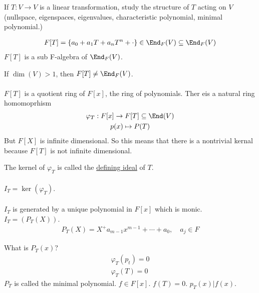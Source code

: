 \documentclass[class=scrartcl, crop=false]{standalone}
\begin{document}
If $T: V \to V$ is a linear transformation, study the structure of $T$ acting on $V$ (nullspace, eigenspaces, eigenvalues, characteristic polynomial, minimal polynomial.)

\begin{gather*}
  F[T] = \{a_0 + a_1T + a_nT^n + \cdot\} \in \End_F(V) \subseteq \End_F(V)
\end{gather*} 
$F[T]$ is a sub F-algebra of $\End_F(V)$.
\begin{remark}
  If $\dim(V) > 1$, then $F[T] \neq \End_F(V)$.
  \\\\
  $F[T]$ is a quotient ring of $F[x]$, the ring of polynomials. Ther eis a natural ring homomoprhism
  \begin{gather*}
    \varphi_T: F[x] \to F[T] \subseteq \End(V) \\
    p(x) \mapsto P(T)
  \end{gather*} 
  But $F[X]$ is infinite dimensional. So this means that there is a nontrivial kernal because $F[T]$ is not infinite dimensional.
\end{remark} 

\begin{definition}
  The kernel of $\varphi_T$ is called the \ul{defining ideal} of $T$.
  \\\\
  $I_T = \ker(\varphi_T)$.
  \\\\
  $I_T$ is generated by a unique polynomial in $F[x]$ which is monic. $I_T = (P_T(X))$. 
  \begin{gather*}
    P_T(X) = X^ + a_{m - 1}x^{m - 1} + \cdots + a_0, \quad a_j \in F
  \end{gather*} 
\end{definition} 

What is $P_T(x)$?
\begin{gather*}
  \varphi_T(p_t) = 0 \\
  \varphi_T(T) = 0
\end{gather*} 
$P_T$ is called the minimal polynomial. $f \in F[x]$. $f(T) = 0$. $p_T(x) | f(x)$.
\end{document}
